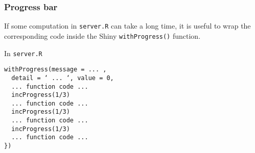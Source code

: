 \documentclass{beamer}
\begin{document}
	\begin{frame}[fragile]
		\frametitle{Progress bar}

		If some computation in \verb|server.R| can take a long time, it is useful to wrap the corresponding code inside the Shiny \verb|withProgress()| function.

		\vspace{1em}

		In \verb|server.R|
		\begin{exampleblock}{}
		\begin{BVerbatim}
withProgress(message = ... ,
  detail = ‘ ... ‘, value = 0,
  ... function code ...
  incProgress(1/3)
  ... function code ...
  incProgress(1/3)
  ... function code ...
  incProgress(1/3)
  ... function code ...
})
		\end{BVerbatim}
		\end{exampleblock}{}

	\end{frame}
\end{document}
